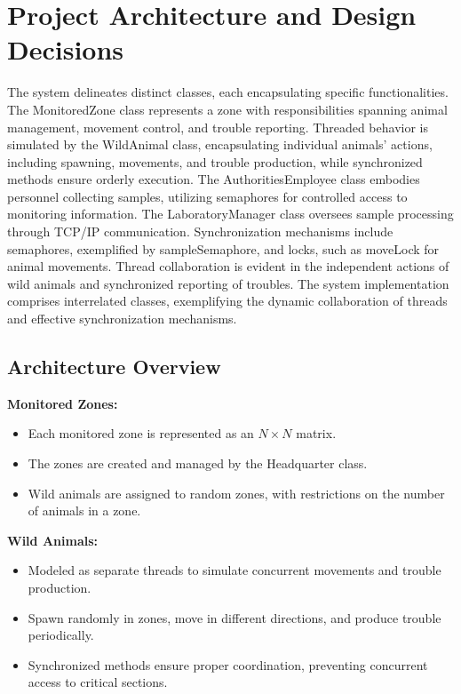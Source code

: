 \documentclass{article}
\begin{document}
\section{Project Architecture and Design Decisions}
The system delineates distinct classes, each encapsulating specific functionalities. The MonitoredZone class represents a zone with responsibilities spanning animal management, movement control, and trouble reporting. Threaded behavior is simulated by the WildAnimal class, encapsulating individual animals' actions, including spawning, movements, and trouble production, while synchronized methods ensure orderly execution. The AuthoritiesEmployee class embodies personnel collecting samples, utilizing semaphores for controlled access to monitoring information. The LaboratoryManager class oversees sample processing through TCP/IP communication. Synchronization mechanisms include semaphores, exemplified by sampleSemaphore, and locks, such as moveLock for animal movements. Thread collaboration is evident in the independent actions of wild animals and synchronized reporting of troubles. The system implementation comprises interrelated classes, exemplifying the dynamic collaboration of threads and effective synchronization mechanisms.

\subsection{Architecture Overview}
\textbf{Monitored Zones:}
\begin{itemize}
    \item Each monitored zone is represented as an $N \times N$ matrix.
    \item The zones are created and managed by the Headquarter class.
    \item Wild animals are assigned to random zones, with restrictions on the number of animals in a zone.
\end{itemize}

\textbf{Wild Animals:}
\begin{itemize}
    \item Modeled as separate threads to simulate concurrent movements and trouble production.
    \item Spawn randomly in zones, move in different directions, and produce trouble periodically.
    \item Synchronized methods ensure proper coordination, preventing concurrent access to critical sections.
\end{itemize}
\end{document}
